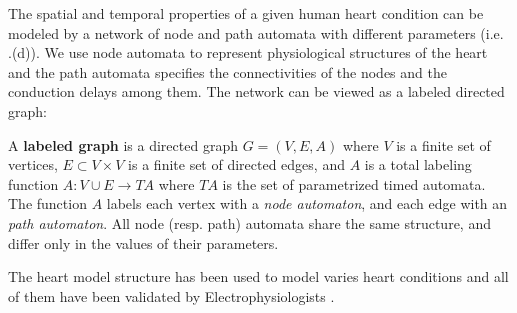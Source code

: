 %
The spatial and temporal properties of a given human heart condition can be modeled by a network of node and path automata with different parameters (i.e. .(d)). We use node automata to represent physiological structures of the heart and the path automata specifies the connectivities of the nodes and the conduction delays among them. The network can be viewed as a labeled directed graph: %
\begin{defn}
	A \textbf{labeled graph} is a directed graph $G = (V,E,A)$ where 
	$V$ is a finite set of vertices, $E \subset V\times V$ is a finite set of directed edges,
	and $A$ is a total labeling function $A: V \cup E \rightarrow TA$
	where $TA$ is the set of parametrized timed automata.
	The function $A$ labels each vertex with a \emph{node automaton}, and each edge with an \emph{path automaton}.
	All node (resp. path) automata share the same structure, and differ only in the values of their parameters.
\end{defn}
The heart model structure has been used to model varies heart conditions and all of them have been validated by Electrophysiologists \cite{vhm_ecrts10,vhm_embc10}.


